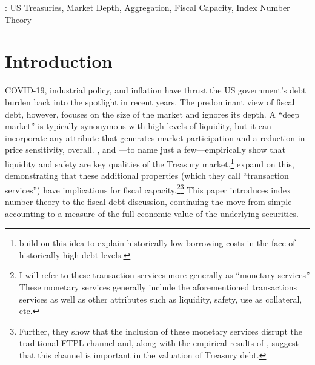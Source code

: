 \documentclass[11pt,a4paper,margin=1.5in]{article}
\begin{document}
: US Treasuries, Market Depth, Aggregation, Fiscal Capacity, Index Number Theory
\newpage
\setcounter{page}{1}


\section{Introduction}

COVID-19, industrial policy, and inflation have thrust the US government's debt burden back into the spotlight in recent years.
The predominant view of fiscal debt, however, focuses on the size of the market and ignores its depth.
A ``deep market'' is typically synonymous with high levels of liquidity, but it can incorporate any attribute that generates market participation and a reduction in price sensitivity, overall. 
\citet{Krishnamurthy-VissingJorgensen:2012} \citet{Krishnamurthy-VissingJorgensen:2013}, and \citet{Nagel:2016}---to name just a few---empirically show that liquidity and safety are key qualities of the Treasury market.\footnote{
	\citet*{Caballero-Farhi-Gourinchas:2017} build on this idea to explain historically low borrowing costs in the face of historically high debt levels.
}
\citet*{Brunnermeier-Merkel-Sannikov:2022} expand on this, demonstrating that these additional properties (which they call ``transaction services'') have implications for fiscal capacity.\footnote{
	I will refer to these transaction services more generally as ``monetary services''
	These monetary services generally include the aforementioned transactions services as well as other attributes such as liquidity, safety, use as collateral, etc.}\footnote{
		Further, they show that the inclusion of these monetary services disrupt the traditional FTPL channel \citep[see][as a seminal example]{Leeper:1991} and, along with the empirical results of \citet{Jiang-etal:2019}, suggest that this channel is important in the valuation of Treasury debt. 
	}
This paper introduces index number theory to the fiscal debt discussion, continuing the move from simple accounting to a measure of the full economic value of the underlying securities.
\end{document}
